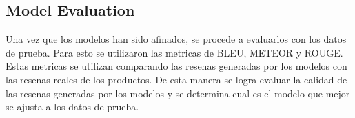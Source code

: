 \subsection{Model Evaluation}
Una vez que los modelos han sido afinados, se procede a evaluarlos con los datos de prueba. Para esto se utilizaron las metricas de BLEU, METEOR y ROUGE. Estas metricas se utilizan comparando las resenas generadas por los modelos con las resenas reales de los productos. De esta manera se logra evaluar la calidad de las resenas generadas por los modelos y se determina cual es el modelo que mejor se ajusta a los datos de prueba.